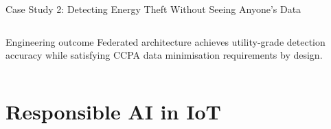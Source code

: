 \documentclass[aspectratio=169,11pt]{beamer}
\begin{document}
\begin{frame}[shrink]{Case Study 2: Detecting Energy Theft Without Seeing Anyone's Data}
\begin{columns}
        \vspace{0.1cm}
        \begin{exampleblock}{Engineering outcome}
            Federated architecture achieves utility-grade detection accuracy while satisfying CCPA data minimisation requirements by design.
        \end{exampleblock}
    \end{columns}
\end{frame}

\section{Responsible AI in IoT}
\end{document}
